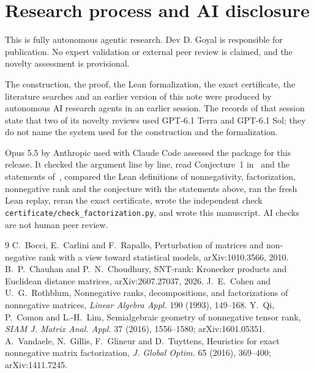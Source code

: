 \documentclass[11pt]{article}
\theoremstyle{remark}
\newcommand{\code}[1]{\nolinkurl{#1}}
\begin{document}
\section*{Research process and AI disclosure}

This is fully autonomous agentic research. Dev D. Goyal is responsible for publication. No expert validation or external peer review is claimed, and the novelty assessment is provisional.

The construction, the proof, the Lean formalization, the exact certificate, the literature searches and an earlier version of this note were produced by autonomous AI research agents in an earlier session. The records of that session state that two of its novelty reviews used GPT-6.1 Terra and GPT-6.1 Sol; they do not name the system used for the construction and the formalization.

Opus 5.5 by Anthropic used with Claude Code assessed the package for this release. It checked the argument line by line, read Conjecture~1 in~\cite{VGGT} and the statements of~\cite{CC}, compared the Lean definitions of nonnegativity, factorization, nonnegative rank and the conjecture with the statements above, ran the fresh Lean replay, reran the exact certificate, wrote the independent check \code{certificate/check\_factorization.py}, and wrote this manuscript. AI checks are not human peer review.

\begin{thebibliography}{9}
 C.~Bocci, E.~Carlini and F.~Rapallo, Perturbation of matrices and non-negative rank with a view toward statistical models, arXiv:1010.3566, 2010.
 B.~P.~Chauhan and P.~N.~Choudhury, SNT-rank: Kronecker products and Euclidean distance matrices, arXiv:2607.27037, 2026.
 J.~E.~Cohen and U.~G.~Rothblum, Nonnegative ranks, decompositions, and factorizations of nonnegative matrices, \emph{Linear Algebra Appl.} 190 (1993), 149--168.
 Y.~Qi, P.~Comon and L.-H.~Lim, Semialgebraic geometry of nonnegative tensor rank, \emph{SIAM J. Matrix Anal. Appl.} 37 (2016), 1556--1580; arXiv:1601.05351.
 A.~Vandaele, N.~Gillis, F.~Glineur and D.~Tuyttens, Heuristics for exact nonnegative matrix factorization, \emph{J. Global Optim.} 65 (2016), 369--400; arXiv:1411.7245.
\end{thebibliography}
\end{document}
